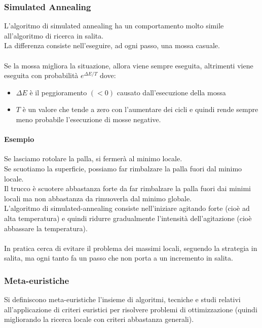 \documentclass[../main.tex]{subfiles}
\begin{document}
	\subsubsection{Simulated Annealing}
	L'algoritmo di simulated annealing ha un comportamento molto simile all'algoritmo di ricerca in salita.\\
	La differenza consiste nell'eseguire, ad ogni passo, una mossa casuale.\\\\
	Se la mossa migliora la situazione, allora viene sempre eseguita, altrimenti viene eseguita con probabilità $e^{\Delta E/T}$ dove:
	\begin{itemize}
		\item $\Delta E$ è il peggioramento $(<0)$ causato dall'esecuzione della mossa
		\item $T$ è un valore che tende a zero con l’aumentare dei cicli e quindi rende sempre meno probabile l’esecuzione di mosse negative.
	\end{itemize}
	\paragraph{Esempio}
	Se lasciamo rotolare la palla, si fermerà al minimo locale. \\
	Se scuotiamo la superficie, possiamo far rimbalzare la palla fuori dal minimo locale. \\
	Il trucco è scuotere abbastanza forte da far rimbalzare la palla fuori dai minimi locali ma non abbastanza da rimuoverla dal minimo globale. \\
	L’algoritmo di simulated-annealing consiste nell’iniziare agitando forte (cioè ad alta temperatura) e quindi ridurre gradualmente l’intensità dell’agitazione (cioè abbassare la temperatura).\\\\
	In pratica cerca di evitare il problema dei massimi locali, seguendo la strategia in salita, ma ogni tanto fa un passo che non porta a un incremento in salita.
	\subsubsection{Meta-euristiche} 
	Si definiscono meta-euristiche l’insieme di algoritmi, tecniche e studi relativi all'applicazione di criteri euristici per risolvere problemi di ottimizzazione (quindi migliorando la ricerca locale con criteri abbastanza generali).
\end{document}
